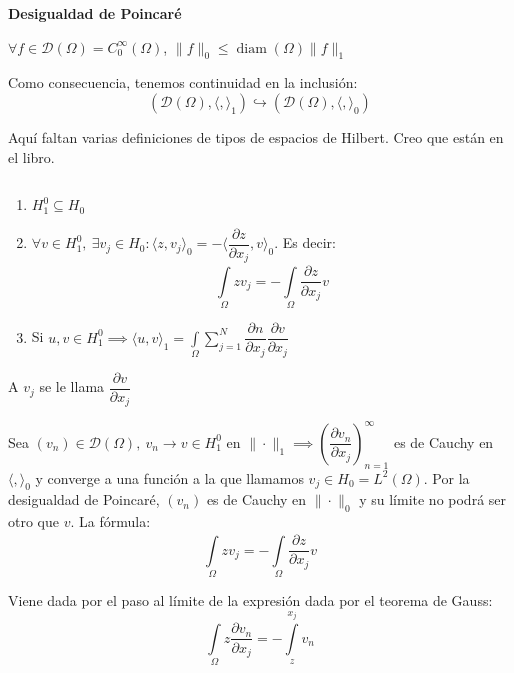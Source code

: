 \documentclass[openany]{book}
\begin{document}




\begin{theorem}
    \textbf{Desigualdad de Poincaré}

    $ \forall  f \in \mathcal{D}(\Omega ) =  C_{0}^{\infty}(\Omega ) $, $ \|f\|_{0}\leq \operatorname{diam}(\Omega )\|f\|_{1} $
\end{theorem}

Como consecuencia, tenemos continuidad en la inclusión:
$$ (\mathcal{D}(\Omega ), \langle ,  \rangle_{1}) \hookrightarrow (\mathcal{D}(\Omega ),\langle ,  \rangle_{0}) $$ 

Aquí faltan varias definiciones de tipos de espacios de Hilbert. Creo que están en el libro.

\begin{lemma}$  $

    \begin{enumerate}
        \item $ H_{1}^{0} \subseteq  H_0 $
        \item $ \forall v \in H_1^{0},\ \exists v_j \in H_0: \langle z, v_j \rangle_{0} = - \langle \dfrac{\partial z}{\partial x_j}, v \rangle_{0} $. Es decir:
        $$ \int\limits_{\Omega }^{} zv_j = - \int\limits_{\Omega }^{} \dfrac{\partial z}{\partial x_j}v $$
        \item Si $ u,v \in H^{0}_{1} \implies \langle u, v \rangle_{1} = \int\limits_{\Omega }^{} \sum\limits_{j=1}^{N} \dfrac{\partial n}{\partial x_j} \dfrac{\partial v}{\partial x_j} $
    \end{enumerate}

    A $ v_j $ se le llama $ \dfrac{\partial v}{\partial x_j} $
\end{lemma}

\begin{demonstration}
    Sea $ (v_n) \in \mathcal{D}(\Omega ),\ v_n \to v \in H_1^{0} $ en $ \|\cdot \|_{1} \implies \left( \dfrac{\partial v_n}{\partial x_j} \right)_{n=1}^{\infty} $ es de Cauchy en $ \langle ,  \rangle_{0} $ y converge a una función a la que llamamos $ v_j \in H_0 = L^2(\Omega )$. Por la desigualdad de Poincaré, $ (v_n)$ es de Cauchy en $ \|\cdot \|_{0}$ y su límite no podrá ser otro que $ v$. La fórmula:
    $$ \int\limits_{\Omega }^{}zv_j = - \int\limits_{\Omega }^{} \dfrac{\partial z}{\partial x_j} v $$

    Viene dada por el paso al límite de la expresión dada por el teorema de Gauss:
    $$ \int\limits_{\Omega }^{} z \dfrac{\partial v_n}{\partial x_j} = - \int\limits_{z}^{x_j}v_n $$
    
\end{demonstration}
\end{document}
